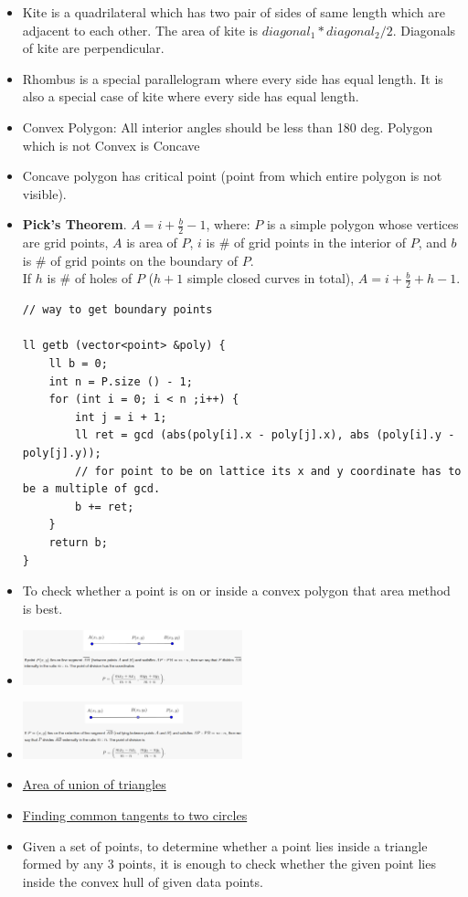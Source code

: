 \documentclass[8pt, a4paper, oneside, twocolumn]{extarticle}
\begin{document}
\begin{itemize}
\begin{itemize}
    \end{itemize}
    \item Kite is a quadrilateral which has two pair of sides of same length which are adjacent to each other. The area of kite is $diagonal_1*diagonal_2/2$. Diagonals of kite are perpendicular.
    \item Rhombus is a special parallelogram where every side has equal length. It is also a special case of kite where every side has equal length.    
    \item Convex Polygon: All interior angles should be less than 180 deg. Polygon which is not Convex is Concave
    \item Concave polygon has critical point (point from which entire polygon is not visible).
    \item \textbf{Pick's Theorem}. $A=i+\frac{b}{2}-1$, where: $P$ is a simple polygon whose vertices are grid points, $A$ is area of $P$, $i$ is \# of grid points in the interior of $P$, and $b$ is \# of grid points on the boundary of $P$. \\
    If $h$ is \# of holes of $P$ ($h+1$ simple closed curves in total), $A=i+\frac{b}{2}+h-1$.
    \begin{verbatim}
// way to get boundary points

ll getb (vector<point> &poly) {
    ll b = 0;
    int n = P.size () - 1;
    for (int i = 0; i < n ;i++) {
        int j = i + 1; 
        ll ret = gcd (abs(poly[i].x - poly[j].x), abs (poly[i].y - poly[j].y));
        // for point to be on lattice its x and y coordinate has to be a multiple of gcd.
        b += ret;
    }
    return b;
}
    \end{verbatim}
    \item To check whether a point is on or inside a convex polygon that area method is best.
    \item \includegraphics[width=0.5\textwidth,height=0.5\textheight,keepaspectratio]{assets/p1} 
    \item \includegraphics[width=0.5\textwidth,height=0.5\textheight,keepaspectratio]{assets/p2}
    \item \href{https://github.com/sourabhxyz/Competitive-Programming/blob/master/Libs/areaOfUnionOfTriangles.cpp}{Area of union of triangles}
    \item \href{http://e-maxx.ru/algo/circle_tangents}{Finding common tangents to two circles}
    \item Given a set of points, to determine whether a point lies inside a triangle formed by any 3 points, it is enough to check whether the given point lies inside the convex hull of given data points.
\end{itemize}
\end{document}
